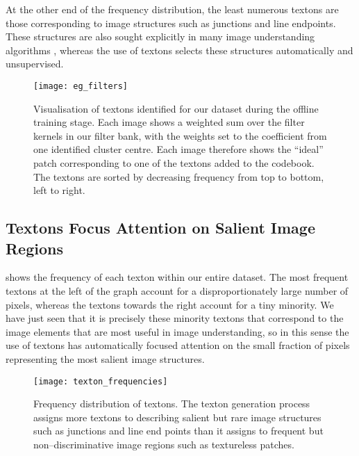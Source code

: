 At the other end of the frequency distribution, the least numerous
textons are those corresponding to image structures such as
junctions and line endpoints. These structures are also sought
explicitly in many image understanding algorithms \cite{Forsyth02},
whereas the use of textons selects these structures automatically and
unsupervised.

\begin{figure}[htp]
\centering
\texttt{[image: eg\_filters]}
\caption{Visualisation of textons identified for our dataset during
  the offline training stage. Each image shows a weighted sum over the
  filter kernels in our filter bank, with the weights set to the
  coefficient from one identified cluster centre. Each image therefore
  shows the ``ideal'' patch corresponding to one of the textons added
  to the codebook. The textons are sorted by decreasing frequency from
  top to bottom, left to right.}
\label{fig:textons-generated}
\end{figure}

\subsection{Textons Focus Attention on Salient Image Regions}
 shows the frequency of each texton within
our entire dataset. The most frequent textons at the left of the graph
account for a disproportionately large number of pixels, whereas the
textons towards the right account for a tiny minority. We have just
seen that it is precisely these minority textons that correspond to
the image elements that are most useful in image understanding, so in
this sense the use of textons has automatically focused attention on
the small fraction of pixels representing the most salient image
structures.

\begin{figure}[htp]
\centering
\texttt{[image: texton\_frequencies]}
\caption{Frequency distribution of textons. The texton generation
  process assigns more textons to describing salient but rare image
  structures such as junctions and line end points than it assigns to
  frequent but non--discriminative image regions such as textureless
  patches.}
\label{fig:texton-freq-distr}
\end{figure}

